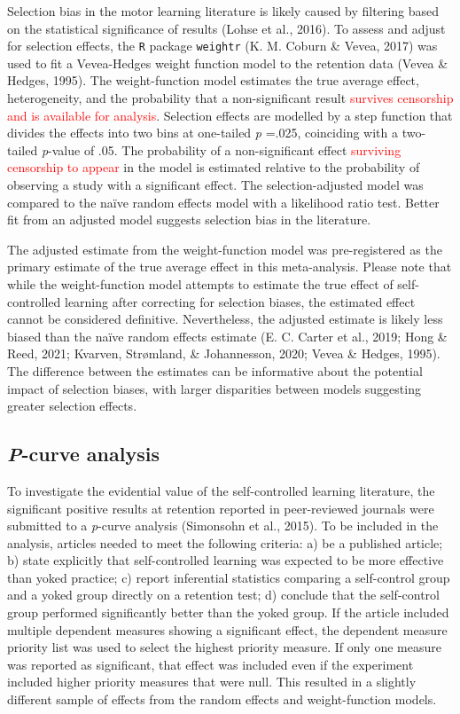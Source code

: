 \documentclass[
  english,
  man,floatsintext]{apa7}
\begin{document}
Selection bias in the motor learning literature is likely caused by filtering based on the statistical significance of results (Lohse et al., 2016). To assess and adjust for selection effects, the \texttt{R} package \texttt{weightr} (K. M. Coburn \& Vevea, 2017) was used to fit a Vevea-Hedges weight function model to the retention data (Vevea \& Hedges, 1995). The weight-function model estimates the true average effect, heterogeneity, and the probability that a non-significant result \textcolor{red}{survives censorship and is available for analysis}. Selection effects are modelled by a step function that divides the effects into two bins at one-tailed \emph{p} =.025, coinciding with a two-tailed \emph{p}-value of .05. The probability of a non-significant effect \textcolor{red}{surviving censorship to appear} in the model is estimated relative to the probability of observing a study with a significant effect. The selection-adjusted model was compared to the naïve random effects model with a likelihood ratio test. Better fit from an adjusted model suggests selection bias in the literature.

The adjusted estimate from the weight-function model was pre-registered as the primary estimate of the true average effect in this meta-analysis. Please note that while the weight-function model attempts to estimate the true effect of self-controlled learning after correcting for selection biases, the estimated effect cannot be considered definitive. Nevertheless, the adjusted estimate is likely less biased than the naïve random effects estimate (E. C. Carter et al., 2019; Hong \& Reed, 2021; Kvarven, Strømland, \& Johannesson, 2020; Vevea \& Hedges, 1995). The difference between the estimates can be informative about the potential impact of selection biases, with larger disparities between models suggesting greater selection effects.

\hypertarget{p-curve-analysis}{%
\subsection{\texorpdfstring{\emph{P}-curve analysis}{P-curve analysis}}\label{p-curve-analysis}}

To investigate the evidential value of the self-controlled learning literature, the significant positive results at retention reported in peer-reviewed journals were submitted to a \emph{p}-curve analysis (Simonsohn et al., 2015). To be included in the analysis, articles needed to meet the following criteria: a) be a published article; b) state explicitly that self-controlled learning was expected to be more effective than yoked practice; c) report inferential statistics comparing a self-control group and a yoked group directly on a retention test; d) conclude that the self-control group performed significantly better than the yoked group. If the article included multiple dependent measures showing a significant effect, the dependent measure priority list was used to select the highest priority measure. If only one measure was reported as significant, that effect was included even if the experiment included higher priority measures that were null. This resulted in a slightly different sample of effects from the random effects and weight-function models.
\end{document}
